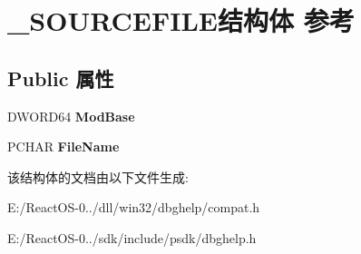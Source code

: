\hypertarget{struct___s_o_u_r_c_e_f_i_l_e}{}\section{\+\_\+\+S\+O\+U\+R\+C\+E\+F\+I\+L\+E结构体 参考}
\label{struct___s_o_u_r_c_e_f_i_l_e}
\subsection*{Public 属性}
\begin{DoxyCompactItemize}
\item 
\mbox{\label{struct___s_o_u_r_c_e_f_i_l_e_a10352f785cac2d890b6d2e2f1e834ff2}} 
D\+W\+O\+R\+D64 {\bfseries Mod\+Base}
\item 
\mbox{\label{struct___s_o_u_r_c_e_f_i_l_e_aa8318dcf38bed6960080c04edf115d6b}} 
P\+C\+H\+AR {\bfseries File\+Name}
\end{DoxyCompactItemize}


该结构体的文档由以下文件生成\+:\begin{DoxyCompactItemize}
\item 
E\+:/\+React\+O\+S-\/0../dll/win32/dbghelp/compat.\+h\item 
E\+:/\+React\+O\+S-\/0../sdk/include/psdk/dbghelp.\+h\end{DoxyCompactItemize}
